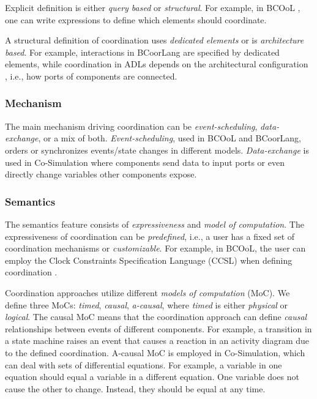 \documentclass[runningheads]{llncs}
\begin{document}
Explicit definition is either \textit{query based} or \textit{structural}.
For example, in BCOoL \cite{varalarsenBCOolBehavioralCoordination2016,varalarsenBehavioralCoordinationOperator2015}, one can write expressions to define which elements should coordinate.

A structural definition of coordination uses \textit{dedicated elements} or is \textit{architecture based}.
For example, interactions in BCoorLang are specified by dedicated elements, while coordination in ADLs depends on the architectural configuration \cite{medvidovicClassificationComparisonFramework2000}, i.e., how ports of components are connected.

\subsubsection{Mechanism} The main mechanism driving coordination can be \textit{event-scheduling}, \textit{data-exchange}, or a mix of both.
\textit{Event-scheduling}, used in BCOoL and BCoorLang, orders or synchronizes events/state changes in different models.
\textit{Data-exchange} is used in Co-Simulation where components send data to input ports or even directly change variables other components expose.

\subsubsection{Semantics} The semantics feature consists of \textit{expressiveness} and \textit{model of computation}.
The expressiveness of coordination can be \textit{predefined}, i.e., a user has a fixed set of coordination mechanisms or \textit{customizable}.
For example, in BCOoL, the user can employ the Clock Constraints Specification Language (CCSL) \cite{andreSyntaxSemanticsClock2009} when defining coordination \cite{varalarsenBCOolBehavioralCoordination2016,varalarsenBehavioralCoordinationOperator2015}.

Coordination approaches utilize different \textit{models of computation} (MoC).
We define three MoCs: \textit{timed}, \textit{causal}, \textit{a-causal}, where \textit{timed} is either \textit{physical} or \textit{logical}.
The causal MoC means that the coordination approach can define \textit{causal} relationships between events of different components.
For example, a transition in a state machine raises an event that causes a reaction in an activity diagram due to the defined coordination.
A-causal MoC is employed in Co-Simulation, which can deal with sets of differential equations.
For example, a variable in one equation should equal a variable in a different equation.
One variable does not cause the other to change.
Instead, they should be equal at any time.
\end{document}
